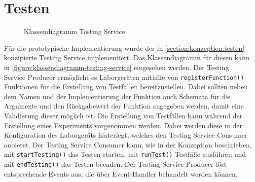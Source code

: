 \section{Testen}\label{section:prototypische-implementierung:testen}

\begin{figure}[tbp]
    \centering
    \caption{Klassendiagramm Testing Service}
    \label{figure:klassendiagramm-testing-service}
\end{figure}

Für die prototypische Implementierung wurde der in \autoref{section:konzeption:testen} konzipierte Testing Service implementiert. Das Klassendiagramm für diesen kann in \autoref{figure:klassendiagramm-testing-service} eingesehen werden. Der Testing Service Producer ermöglicht es Laborgeräten mithilfe von \texttt{registerFunction()} Funktionen für die Erstellung von Testfällen bereitzustellen. Dabei sollten neben dem Namen und der Implementierung der Funktion auch Schemata für die Argumente und den Rückgabewert der Funktion angegeben werden, damit eine Validierung dieser möglich ist. Die Erstellung von Testfällen kann während der Erstellung eines Experiments vorgenommen werden. Dabei werden diese in der Konfiguration des Laborgeräts hinterlegt, welches den Testing Service Consumer anbietet. Der Testing Service Consumer kann, wie in der Konzeption beschrieben, mit \texttt{startTesting()} das Testen starten, mit \texttt{runTest()} Testfälle ausführen und mit \texttt{endTesting()} das Testen beenden. Der Testing Service Producer löst entsprechende Events aus, die über Event-Handler behandelt werden können.

